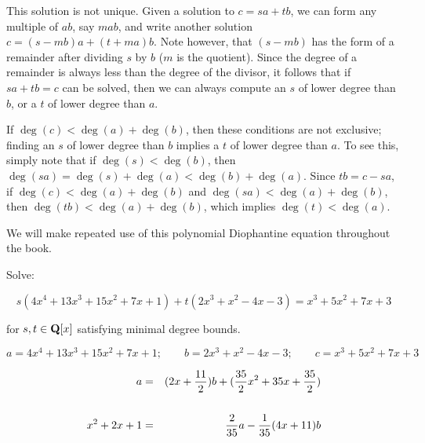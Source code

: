 This solution is not unique.  Given a solution to $c=sa+tb$, we can
form any multiple of $ab$, say $mab$, and write another solution
$c=(s-mb)a+(t+ma)b$.  Note however, that $(s-mb)$ has the form of a
remainder after dividing $s$ by $b$ ($m$ is the quotient).  Since the
degree of a remainder is always less than the degree of the divisor,
it follows that if $sa+tb=c$ can be solved, then we can always compute
an $s$ of lower degree than $b$, or a $t$ of lower degree than $a$.

If $\deg(c)<\deg(a)+\deg(b)$, then these conditions are not exclusive;
finding an $s$ of lower degree than $b$ implies a $t$ of lower degree
than $a$.  To see this, simply note that if $\deg(s)<\deg(b)$, then
$\deg(sa)=\deg(s)+\deg(a)<\deg(b)+\deg(a)$.  Since $tb=c-sa$, if
$\deg(c)<\deg(a)+\deg(b)$ and $\deg(sa)<\deg(a)+\deg(b)$, then
$\deg(tb)<\deg(a)+\deg(b)$, which implies $\deg(t)<\deg(a)$.

We will make repeated use of this polynomial Diophantine equation
throughout the book.

\vfill\eject


Solve:

$$s(4x^4+13x^3+15x^2+7x+1) + t(2x^3+x^2-4x-3) = x^3 + 5x^2 + 7x +3$$

\quad for $s,t \in {\bf Q}[x]$ satisfying minimal degree bounds.

\bigskip




$$a = 4x^4+13x^3+15x^2+7x+1; \qquad
b = 2x^3+x^2-4x-3; \qquad
c = x^3 + 5x^2 + 7x +3$$


\begin{eqnarray*}
a &=& (2x+{11\over2})b + ({35\over2}x^2+35x+{35\over2})
 \cr\cr
x^2+2x+1 &=& {2\over35}a - {1\over35}(4x+11)b \cr
\end{eqnarray*}


